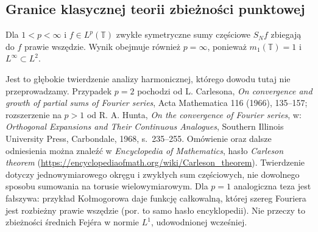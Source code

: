 \subsection{Granice klasycznej teorii zbieżności punktowej}

\begin{twierdzenie}
\label{thm:dt-carleson-hunt}
Dla $1<p<\infty$ i $f\in L^p(\mathbb T)$
zwykłe symetryczne sumy częściowe $S_N f$
zbiegają do $f$ prawie wszędzie.
Wynik obejmuje również $p=\infty$,
ponieważ $m_1(\mathbb T)=1$ i $L^\infty\subset L^2$.
\end{twierdzenie}

Jest to głębokie twierdzenie analizy harmonicznej,
którego dowodu tutaj nie przeprowadzamy.
Przypadek $p=2$ pochodzi od L. Carlesona,
\emph{On convergence and growth of partial sums
of Fourier series}, Acta Mathematica 116 (1966),
135--157; rozszerzenie na $p>1$ od R. A. Hunta,
\emph{On the convergence of Fourier series},
w: \emph{Orthogonal Expansions and Their Continuous
Analogues}, Southern Illinois University Press,
Carbondale, 1968, s.~235--255.
Omówienie oraz dalsze odniesienia można znaleźć
w \emph{Encyclopedia of Mathematics},
hasło \emph{Carleson theorem}
(\url{https://encyclopediaofmath.org/wiki/Carleson_theorem}).
Twierdzenie dotyczy jednowymiarowego okręgu
i zwykłych sum częściowych, nie dowolnego
sposobu sumowania na torusie wielowymiarowym.
Dla $p=1$ analogiczna teza jest fałszywa:
przykład Kołmogorowa daje funkcję całkowalną,
której szereg Fouriera jest rozbieżny prawie wszędzie
(por. to samo hasło encyklopedii).
Nie przeczy to zbieżności średnich Fejéra
w normie $L^1$, udowodnionej wcześniej.
